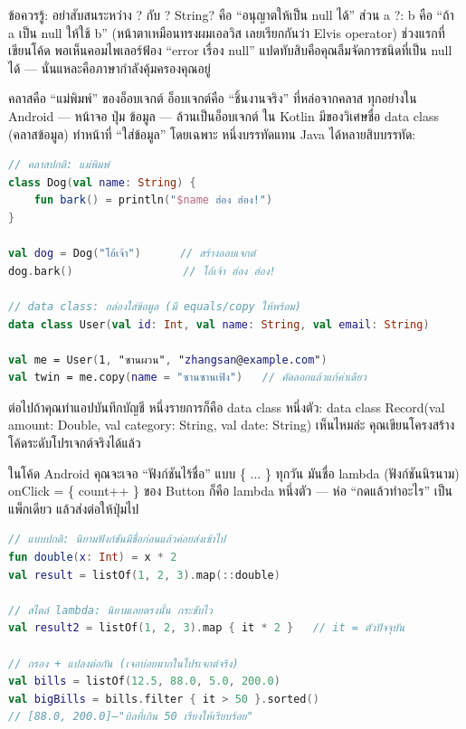 \begin{tcbwarn}{ข้อควรรู้: อย่าสับสนระหว่าง ? กับ ?}
String? คือ “อนุญาตให้เป็น null ได้” ส่วน a ?: b คือ “ถ้า a เป็น null ให้ใช้ b” (หน้าตาเหมือนทรงผมเอลวิส เลยเรียกกันว่า Elvis operator) ช่วงแรกที่เขียนโค้ด พอเห็นคอมไพเลอร์ฟ้อง “error เรื่อง null” แปดทับสิบคือคุณลืมจัดการชนิดที่เป็น null ได้ — นั่นแหละคือภาษากำลังคุ้มครองคุณอยู่

\end{tcbwarn}


คลาสคือ “แม่พิมพ์” ของอ็อบเจกต์ อ็อบเจกต์คือ “ชิ้นงานจริง” ที่หล่อจากคลาส ทุกอย่างใน Android — หน้าจอ ปุ่ม ข้อมูล — ล้วนเป็นอ็อบเจกต์ ใน Kotlin มีของวิเศษชื่อ data class (คลาสข้อมูล) ทำหน้าที่ “ใส่ข้อมูล” โดยเฉพาะ หนึ่งบรรทัดแทน Java ได้หลายสิบบรรทัด:

\begin{lstlisting}[language=Kotlin]
// คลาสปกติ: แม่พิมพ์
class Dog(val name: String) {
    fun bark() = println("$name ฮ่อง ฮ่อง!")
}

val dog = Dog("โอ้เจ้า")      // สร้างออบเจกต์
dog.bark()                 // โอ้เจ้า ฮ่อง ฮ่อง!

// data class: กล่องใส่ข้อมูล (มี equals/copy ให้พร้อม)
data class User(val id: Int, val name: String, val email: String)

val me = User(1, "ซานผวน", "zhangsan@example.com")
val twin = me.copy(name = "ซานซานเฟิง")   // คัดลอกแล้วแก้ค่าเดียว
\end{lstlisting}

ต่อไปถ้าคุณทำแอปบันทึกบัญชี หนึ่งรายการก็คือ data class หนึ่งตัว: data class Record(val amount: Double, val category: String, val date: String) เห็นไหมล่ะ คุณเขียนโครงสร้างโค้ดระดับโปรเจกต์จริงได้แล้ว


ในโค้ด Android คุณจะเจอ “ฟังก์ชันไร้ชื่อ” แบบ \{ ... \} ทุกวัน มันชื่อ lambda (ฟังก์ชันนิรนาม) onClick = \{ count++ \} ของ Button ก็คือ lambda หนึ่งตัว — ห่อ “กดแล้วทำอะไร” เป็นแพ็กเดียว แล้วส่งต่อให้ปุ่มไป

\begin{lstlisting}[language=Kotlin]
// แบบปกติ: นิยามฟังก์ชันมีชื่อก่อนแล้วค่อยส่งเข้าไป
fun double(x: Int) = x * 2
val result = listOf(1, 2, 3).map(::double)

// สไตล์ lambda: นิยามเลยตรงนั้น กระชับไว
val result2 = listOf(1, 2, 3).map { it * 2 }   // it = ตัวปัจจุบัน

// กรอง + แปลงต่อกัน (เจอบ่อยมากในโปรเจกต์จริง)
val bills = listOf(12.5, 88.0, 5.0, 200.0)
val bigBills = bills.filter { it > 50 }.sorted()
// [88.0, 200.0]—"บิลที่เกิน 50 เรียงให้เรียบร้อย"
\end{lstlisting}

